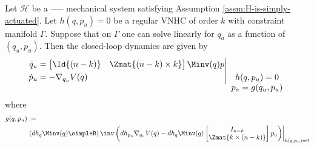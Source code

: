 \begin{thm}\label{thm:zero-dynamics}
    Let \(\mathcal{H}\) be a ----- mechanical system satisfying Assumption
    \ref{assm:H-is-simply-actuated}. Let
    \(h(q,p_u) = 0\) be a regular VNHC of order \(k\) 
    with constraint manifold \(\Gamma\). Suppose that on \(\Gamma\) one can
    solve linearly for \(q_a\) as a function of \((q_u,p_u)\).
    Then the closed-loop dynamics are given by
    \begin{equation}\label{eqn:qpu-dynamics}
        \left.\begin{aligned}
                \dot{q}_u &= \begin{bmatrix}
                    \Id{(n-k)} & \Zmat{(n-k) \times k}
                \end{bmatrix}\Minv(q)p \\
            \dot{p}_u &= -\nabla_{q_u}V(q) \\
            \end{aligned}{}\right|_{\begin{array}{c}
                h(q,p_u) = 0 \\ 
                p_a = g(q_u,p_u) \\
            \end{array}}
    \end{equation}
    where
    \begin{equation}\label{eqn:g-qpu}
    \begin{aligned}
        g(q,p_u) &:= \\
           &\left.\left(dh_q \Minv(q) \simpleB \right)\inv 
        \left(dh_{p_u} \nabla_{q_u}V(q) - dh_q \Minv(q)
        \begin{bmatrix}
            I_{n-k} \\
            \Zmat{k \times (n-k)} \\
        \end{bmatrix} p_u\right)\right|_{h(q,p_u) = 0}
    \end{aligned}
    \end{equation}
\end{thm}

